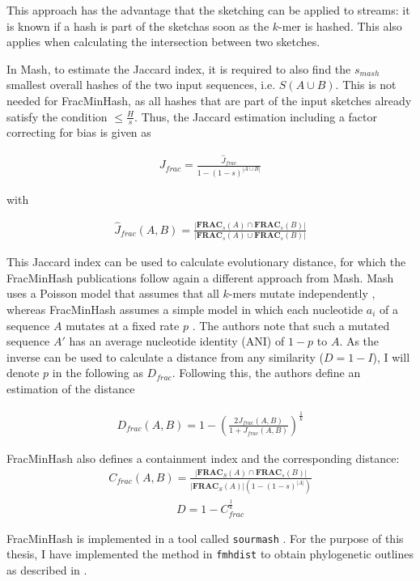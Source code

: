 This approach has the advantage that the sketching can be applied to streams: it
is known if a hash is part of the sketchas soon as the $k$-mer is hashed. This
also applies when calculating the intersection between two sketches. 

In Mash, to estimate the Jaccard index, it is required to also find the
$s_{mash}$ smallest overall hashes of the two input sequences, i.e. $S(A \cup
B)$. This is not needed for FracMinHash, as all hashes that are part of the
input sketches already satisfy the condition $\leq \frac{H}{s}$. Thus, the
Jaccard estimation including a factor correcting for bias is given as

\begin{align}
  J_{frac} = \frac{\hat{J}_{frac}}{1 - (1 - s)^{|A \cup B|}}
\end{align}

with

\begin{align}
  \hat{J}_{frac}(A, B) = \frac{|\mathbf{FRAC}_s(A) \cap \mathbf{FRAC}_s(B)|}{|\mathbf{FRAC}_s(A) \cup \mathbf{FRAC}_s(B)|}  
\end{align}

This Jaccard index can be used to calculate evolutionary distance, for which the
FracMinHash publications follow again a different approach from Mash. Mash uses
a Poisson model that assumes that all $k$-mers mutate independently
\cite{ondovMashFastGenome2016,heraDebiasingFracMinHashDeriving2023,fanAssemblyAlignmentfreeMethod2015},
whereas FracMinHash assumes a simple model in which each nucleotide $a_i$ of a
sequence $A$ mutates at a fixed rate $p$
\cite{heraDebiasingFracMinHashDeriving2023}. The authors note that such a
mutated sequence $A'$ has an average nucleotide identity (ANI) of $1-p$ to $A$.
As the inverse can be used to calculate a distance from any similarity ($D = 1 -
I$), I will denote $p$ in the following as $D_{frac}$. Following this, the
authors define an estimation of the distance 

\begin{align}
  D_{frac}(A, B) = 1 - (\frac{2J_{frac}(A,B)}{1+J_{frac}(A, B)})^{\frac{1}{k}}
\end{align}

FracMinHash also defines a containment index and the corresponding distance:
\begin{align}
  C_{frac}(A, B) = \frac{|\mathbf{FRAC}_S(A) \cap \mathbf{FRAC}_s(B)|}{|\mathbf{FRAC}_S(A)| (1-(1-s)^{|A|})}
\end{align}
\begin{align}
  D=1-C_{frac}^{\frac{1}{k}}
\end{align}

FracMinHash is implemented in a tool called \texttt{sourmash}
\cite{irberLightweightCompositionalAnalysis2022,irberDecentralizingIndicesGenomic2020}.
For the purpose of this thesis, I have implemented the method in
\texttt{fmhdist} to obtain phylogenetic outlines as described in
\cite{bagciMicrobialPhylogeneticContext2021}.
